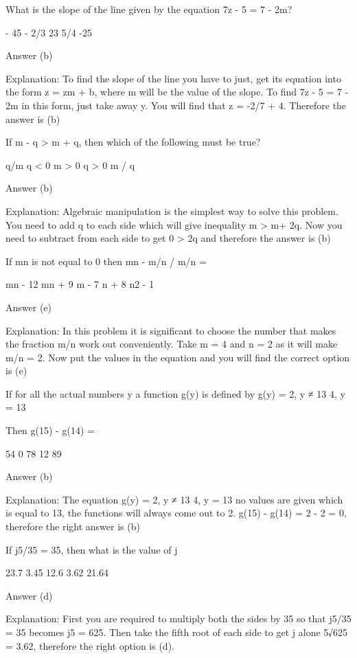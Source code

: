     What is the slope of the line given by the equation 7z - 5 = 7 - 2m?

        - 45
        - 2/3
        23
        5/4
        -25 

    Answer (b)

    Explanation: To find the slope of the line you have to just, get its equation into the form z = zm + b, where m will be the value of the slope. To find 7z - 5 = 7 - 2m in this form, just take away y. You will find that z = -2/7 + 4. Therefore the answer is (b)

    If m - q > m + q, then which of the following must be true?

        q/m
        q < 0
        m > 0
        q > 0
        m / q 

    Answer (b)

    Explanation: Algebraic manipulation is the simplest way to solve this problem. You need to add q to each side which will give inequality m > m+ 2q. Now you need to subtract from each side to get 0 > 2q and therefore the answer is (b)

    If mn is not equal to 0 then mn - m/n / m/n =

        mn - 12
        mn + 9
        m - 7
        n + 8
        n2 - 1 

    Answer (e)

    Explanation: In this problem it is significant to choose the number that makes the fraction m/n work out conveniently. Take m = 4 and n = 2 as it will make m/n = 2. Now put the values in the equation and you will find the correct option is (e)

    If for all the actual numbers y a function g(y) is defined by g(y) = {2, y ≠ 13 4, y = 13}

    Then g(15) - g(14) =

        54
        0
        78
        12
        89 

    Answer (b)

    Explanation: The equation g(y) = {2, y ≠ 13 4, y = 13} no values are given which is equal to 13, the functions will always come out to 2. g(15) - g(14) = 2 - 2 = 0, therefore the right answer is (b)

    If j5/35 = 35, then what is the value of j

        23.7
        3.45
        12.6
        3.62
        21.64 

    Answer (d)

    Explanation: First you are required to multiply both the sides by 35 so that j5/35 = 35 becomes j5 = 625. Then take the fifth root of each side to get j alone 5√625 = 3.62, therefore the right option is (d). 

